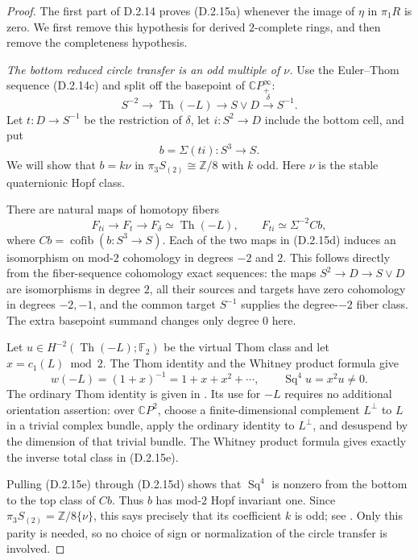 \begin{proof}
The first part of D.2.14 proves \textup{(D.2.15a)} whenever the image
of $\eta$ in $\pi_1R$ is zero. We first remove this hypothesis for
derived $2$-complete rings, and then remove the completeness
hypothesis.

\emph{The bottom reduced circle transfer is an odd multiple of $\nu$.}
Use the Euler--Thom sequence \textup{(D.2.14c)} and split off the
basepoint of $\mathbb CP^\infty_+$:
\[
 S^{-2}\longrightarrow\operatorname{Th}(-L)
  \longrightarrow S\vee D\xrightarrow{\delta}S^{-1}.
\]
Let $t:D\to S^{-1}$ be the restriction of $\delta$, let
$i:S^2\to D$ include the bottom cell, and put
\[
 b=\Sigma(ti):S^3\longrightarrow S.
 \tag{D.2.15c}
\]
We will show that $b=k\nu$ in
$\pi_3S_{(2)}\cong\mathbb Z/8$ with $k$ odd. Here $\nu$ is the
stable quaternionic Hopf class.

There are natural maps of homotopy fibers
\[
 F_{ti}\longrightarrow F_t\longrightarrow F_\delta
       \simeq\operatorname{Th}(-L),
 \qquad F_{ti}\simeq\Sigma^{-2}Cb,
 \tag{D.2.15d}
\]
where $Cb=\operatorname{cofib}(b:S^3\to S)$.
Each of the two maps in \textup{(D.2.15d)} induces an isomorphism
on mod-$2$ cohomology in degrees $-2$ and $2$. This follows directly
from the fiber-sequence cohomology exact sequences: the maps
$S^2\to D\to S\vee D$ are isomorphisms in degree $2$, all their
sources and targets have zero cohomology in degrees $-2,-1$, and
the common target $S^{-1}$ supplies the degree-$-2$ fiber class.
The extra basepoint summand changes only degree $0$ here.

Let $u\in H^{-2}(\operatorname{Th}(-L);\mathbb F_2)$ be the
virtual Thom class and let $x=c_1(L)\bmod2$. The Thom identity and
the Whitney product formula give
\[
 w(-L)=(1+x)^{-1}=1+x+x^2+\cdots,
 \qquad \operatorname{Sq}^4u=x^2u\ne0.
 \tag{D.2.15e}
\]
The ordinary Thom identity is given in
\cite[\S8, pp.~91--93]{EH5MilnorStasheff1974}.
Its use for $-L$ requires no additional orientation assertion:
over $\mathbb CP^2$, choose a finite-dimensional complement $L^\perp$
to $L$ in a trivial complex bundle, apply the ordinary identity to
$L^\perp$, and desuspend by the dimension of that trivial bundle.
The Whitney product formula gives exactly the inverse total class
in \textup{(D.2.15e)}.

Pulling \textup{(D.2.15e)} through \textup{(D.2.15d)} shows that
$\operatorname{Sq}^4$ is nonzero from the bottom to the top class
of $Cb$. Thus $b$ has mod-$2$ Hopf invariant one. Since
$\pi_3S_{(2)}=\mathbb Z/8\{\nu\}$, this says precisely that its
coefficient $k$ is odd; see
\cite[Example 7.17, pp.~45--46, and equation (8.1)]{EH5Adams1966}.
Only this parity is needed, so no choice of sign or normalization
of the circle transfer is involved.


\end{proof}
